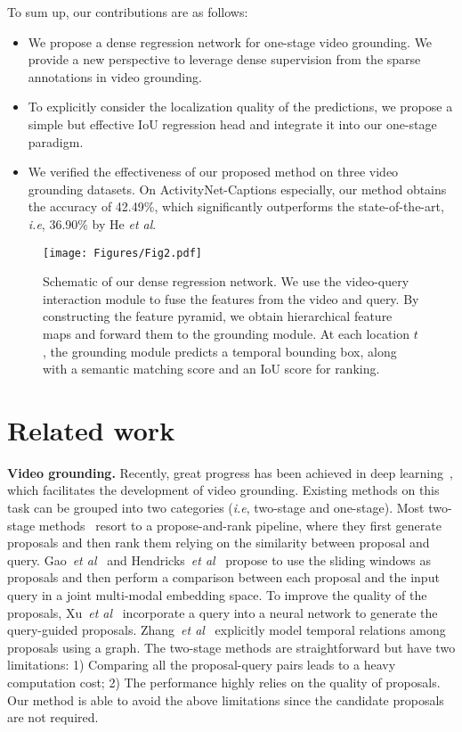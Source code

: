 \documentclass[10pt,twocolumn,letterpaper]{article}
\def\ie{\emph{i.e}\onedot} \def\Ie{\emph{I.e}\onedot}
\def\etal{\emph{et al}\onedot}
\begin{document}
	To sum up, our contributions are as follows:
	\begin{itemize}
		\item We propose a dense regression network for one-stage video grounding. We provide a new perspective to leverage dense supervision from the sparse annotations in video grounding.
		
		\item To explicitly consider the localization quality of the predictions, we propose a simple but effective IoU regression head and integrate it into our one-stage paradigm. 
		
		\item We verified the effectiveness of our proposed method on three video grounding datasets. On ActivityNet-Captions especially, our method obtains the accuracy of 42.49\%, which significantly outperforms the state-of-the-art, \ie, 36.90\% by He \etal\cite{he2019read}.
	\end{itemize}
	
	
	\begin{figure*}[!t]
		\centering
		\texttt{[image: Figures/Fig2.pdf]}
		\caption{Schematic of our dense regression network. We use the video-query interaction module to fuse the features from the video and query. By constructing the feature pyramid, we obtain hierarchical feature maps and forward them to the grounding module. At each location $t$, the grounding module predicts a temporal bounding box, along with a semantic matching score and an IoU score for ranking.}
		\label{fig:overall}
	\end{figure*}


	\section{Related work}
	\noindent \textbf{Video grounding.}
	Recently, great progress has been achieved in deep learning~\cite{zhang2019collaborative,zhang2019whole,cao2019multi,guo2019nat,guo2020multi,guo2019auto,hu2019multi,pmlr-v80-cao18a,zhuang2018discrimination}, which facilitates the development of video grounding. Existing methods on this task can be grouped into two categories (\ie, two-stage and one-stage).
Most two-stage methods~\cite{gao2017tall,hendricks2018localizing, ge2019mac,chen2018temporally,liu2018cross,zhang2019cross} resort to a propose-and-rank pipeline, where they first generate proposals and then rank them relying on the similarity between proposal and query. Gao~\etal~\cite{gao2017tall} and Hendricks~\etal~\cite{hendricks2018localizing} propose to use the sliding windows as proposals and then perform a comparison between each proposal and the input query in a joint multi-modal embedding space. To improve the quality of the proposals, Xu~\etal~\cite{xu2019multilevel} incorporate a query into a neural network to generate the query-guided proposals. Zhang~\etal~\cite{zhang2019man} explicitly model temporal relations among proposals using a graph. The two-stage methods are straightforward but have two limitations: 1) Comparing all the proposal-query pairs
	leads to a heavy computation cost; 2) The performance highly relies on the quality of proposals. Our method is able to avoid the above limitations since the candidate proposals are not required.
	
\end{document}
